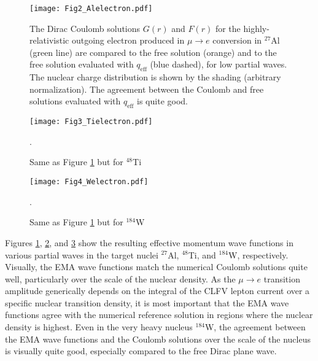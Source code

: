 \documentclass{book}[letterpaper,12pt]
\begin{document}
\begin{figure}
\centering
\texttt{[image: Fig2\_Alelectron.pdf]}
\caption{The Dirac Coulomb solutions $G(r)$ and $F(r)$ for the highly-relativistic outgoing electron produced in $\mu\rightarrow e$ conversion in $^{27}$Al (green line) are compared to the free solution (orange) and to the free solution evaluated with $q_\mathrm{eff}$ (blue dashed), for low partial waves. The nuclear charge distribution is shown by the shading (arbitrary normalization). The agreement between the Coulomb and free solutions evaluated with $q_\mathrm{eff}$ is quite good.}
\label{fig:Alelectron}
\end{figure}
\begin{figure}
\centering
\texttt{[image: Fig3\_Tielectron.pdf]}
\caption{Same as Figure \ref{fig:Alelectron} but for $^{48}$Ti}.
\label{fig:Tielectron}
\end{figure}
\begin{figure}
\centering
\texttt{[image: Fig4\_Welectron.pdf]}
\caption{Same as Figure \ref{fig:Alelectron} but for $^{184}$W}.
\label{fig:Welectron}
\end{figure}
Figures \ref{fig:Alelectron}, \ref{fig:Tielectron}, and \ref{fig:Welectron} show the resulting effective momentum wave functions in various partial waves in the target nuclei $^{27}$Al, $^{48}$Ti, and $^{184}$W, respectively. Visually, the EMA wave functions match the numerical Coulomb solutions quite well, particularly over the scale of the nuclear density. As the $\mu\rightarrow e$ transition amplitude generically depends on the integral of the CLFV lepton current over a specific nuclear transition density, it is most important that the EMA wave functions agree with the numerical reference solution in regions where the nuclear density is highest. Even in the very heavy nucleus $^{184}$W, the agreement between the EMA wave functions and the Coulomb solutions over the scale of the nucleus is visually quite good, especially compared to the free Dirac plane wave.
\end{document}
